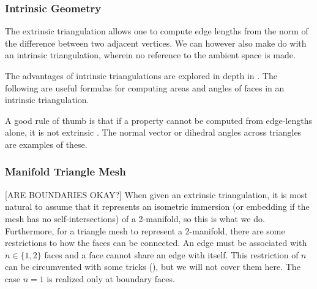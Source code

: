 \subsubsection*{Intrinsic Geometry}
The extrinsic triangulation allows one to compute edge lengths from the norm of the difference between two adjacent vertices. We can however also make do with an intrinsic triangulation, wherein no reference to the ambient space is made. 
\noindent

The advantages of intrinsic triangulations are explored in depth in \cite{sharp2021intrinsic}. The following are useful formulas for computing areas and angles of faces in an intrinsic triangulation.
    


A good rule of thumb is that if a property cannot be computed from edge-lengths alone, it is not extrinsic \cite{sharp2021intrinsic}. The normal vector or dihedral angles across triangles are examples of these.


\subsubsection*{Manifold Triangle Mesh} [ARE BOUNDARIES OKAY?]
When given an extrinsic triangulation, it is most natural to assume that it represents an isometric immersion (or embedding if the mesh has no self-intersections) of a 2-manifold, so this is what we do. Furthermore, for a triangle mesh to represent a 2-manifold, there are some restrictions to how the faces can be connected. An edge must be associated with $n \in \{1, 2\}$ faces and a face cannot share an edge with itself. This restriction of $n$ can be circumvented with some tricks (\cite{nonmanifold_laplacian}), but we will not cover them here. The case $n=1$ is realized only at boundary faces.

